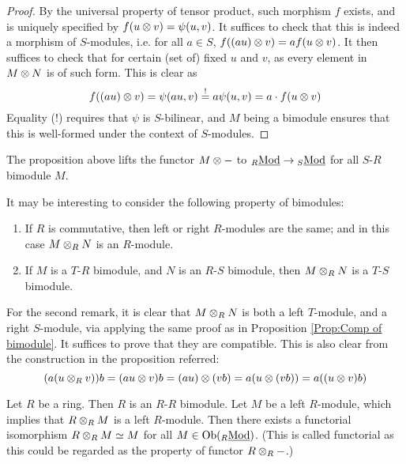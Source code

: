 \begin{proof}
    By the universal property of tensor product, such morphism $f$ exists, and is uniquely specified by $f(u \otimes v) = \psi(u, v)$. It suffices to check that this is indeed a morphism of $S$-modules, i.e. for all $a \in S$, $f((au) \otimes v) = a f(u \otimes v)$. It then suffices to check that for certain (set of) fixed $u$ and $v$, as every element in $M \otimes N$ is of such form. This is clear as
    \[
        f((au) \otimes v) = \psi(au, v) \overset{!}{=} a\psi(u, v) = a\cdot f(u \otimes v)
    \]
    Equality (!) requires that $\psi$ is $S$-bilinear, and $M$ being a bimodule ensures that this is well-formed under the context of $S$-modules. 
\end{proof}

\begin{remark}
    The proposition above lifts the functor $M \otimes -$ to ${}_{R}\underline{\textup{Mod}} \to {}_{S}\underline{\textup{Mod}}$ for all $S$-$R$ bimodule $M$.
\end{remark}

\begin{remark}
    It may be interesting to consider the following property of bimodules:
    \begin{enumerate}
        \item If $R$ is commutative, then left or right $R$-modules are the same; and in this case $M \otimes_R N$ is an $R$-module. 
        \item If $M$ is a $T$-$R$ bimodule, and $N$ is an $R$-$S$ bimodule, then $M \otimes_R N$ is a $T$-$S$ bimodule.
    \end{enumerate}

    For the second remark, it is clear that $M \otimes_R N$ is both a left $T$-module, and a right $S$-module, via applying the same proof as in Proposition \ref{Prop:Comp of bimodule}. It suffices to prove that they are compatible. This is also clear from the construction in the proposition referred:
    \[
        (a(u \otimes_R v)) b = (au \otimes v) b = (au) \otimes (vb) = a(u \otimes (vb)) = a ((u\otimes v) b)
    \]
\end{remark}

\begin{remark}
    Let $R$ be a ring. Then $R$ is an $R$-$R$ bimodule. Let $M$ be a left $R$-module, which implies that $R \otimes_R M$ is a left $R$-module. Then there exists a functorial isomorphism $R \otimes_R M \simeq M$ for all $M \in \mathrm{Ob}({}_{R}\underline{\textup{Mod}})$. (This is called functorial as this could be regarded as the property of functor $R \otimes_R -$.)
\end{remark}

